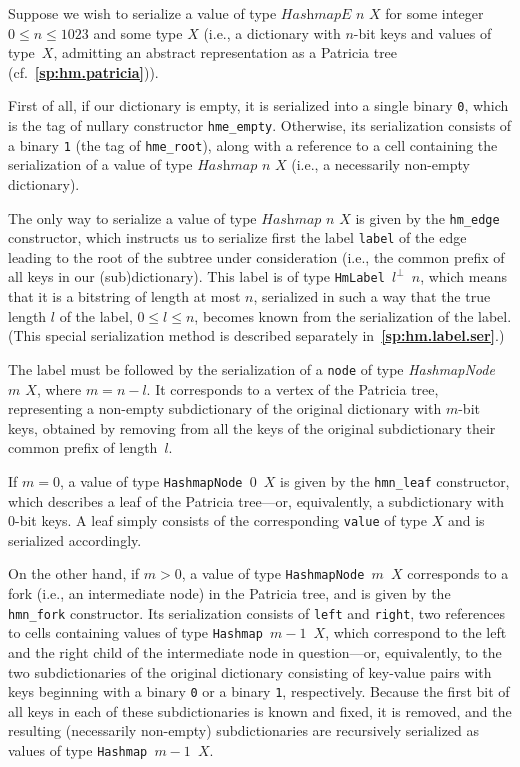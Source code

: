 \documentclass[12pt,oneside]{article}
\def\refpoint#1{{\rm\textbf{\ref{#1}}}}
\let\ptref=\refpoint
\let\tp=\textit
\def\Hashmap{\tp{Hashmap}}
\def\HashmapE{\tp{HashmapE}}
\begin{document}
Suppose we wish to serialize a value of type $\HashmapE$ $n$ $X$ for some integer $0\leq n\leq 1023$ and some type $X$ (i.e., a dictionary with $n$-bit keys and values of type~$X$, admitting an abstract representation as a Patricia tree (cf.~\ptref{sp:hm.patricia})).

First of all, if our dictionary is empty, it is serialized into a single binary {\tt 0}, which is the tag of nullary constructor {\tt hme\_empty}. Otherwise, its serialization consists of a binary {\tt 1} (the tag of {\tt hme\_root}), along with a reference to a cell containing the serialization of a value of type $\Hashmap$ $n$ $X$ (i.e., a necessarily non-empty dictionary).

The only way to serialize a value of type $\Hashmap$ $n$ $X$ is given by the {\tt hm\_edge} constructor, which instructs us to serialize first the label {\tt label} of the edge leading to the root of the subtree under consideration (i.e., the common prefix of all keys in our (sub)dictionary). This label is of type {\tt HmLabel $l^\perp$ $n$}, which means that it is a bitstring of length at most $n$, serialized in such a way that the true length $l$ of the label, $0\leq l\leq n$, becomes known from the serialization of the label. (This special serialization method is described separately in~\ptref{sp:hm.label.ser}.)

The label must be followed by the serialization of a {\tt node} of type {\em Hashmap\-Node $m$ $X$}, where $m=n-l$. It corresponds to a vertex of the Patricia tree, representing a non-empty subdictionary of the original dictionary with $m$-bit keys, obtained by removing from all the keys of the original subdictionary their common prefix of length~$l$.

If $m=0$, a value of type {\tt HashmapNode $0$ $X$} is given by the {\tt hmn\_leaf} constructor, which describes a leaf of the Patricia tree---or, equivalently, a subdictionary with $0$-bit keys. A leaf simply consists of the corresponding {\tt value} of type $X$ and is serialized accordingly.

On the other hand, if $m>0$, a value of type {\tt HashmapNode $m$ $X$} corresponds to a fork (i.e., an intermediate node) in the Patricia tree, and is given by the {\tt hmn\_fork} constructor. Its serialization consists of {\tt left} and {\tt right}, two references to cells containing values of type {\tt Hashmap $m-1$ $X$}, which correspond to the left and the right child of the intermediate node in question---or, equivalently, to the two subdictionaries of the original dictionary consisting of key-value pairs with keys beginning with a binary {\tt 0} or a binary {\tt 1}, respectively. Because the first bit of all keys in each of these subdictionaries is known and fixed, it is removed, and the resulting (necessarily non-empty) subdictionaries are recursively serialized as values of type {\tt Hashmap $m-1$ $X$}.
\end{document}
